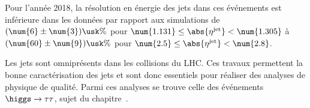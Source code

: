 Pour l'année 2018, la résolution en énergie des jets dans ces événements est inférieure dans les données par rapport aux simulations
de
$(\num{6}\pm\num{3})\usk\%$ pour $\num{1.131} \leq \abs{\eta^\text{jet}} < \num{1.305}$
à
$(\num{60}\pm\num{9})\usk\%$ pour $\num{2.5} \leq \abs{\eta^\text{jet}} < \num{2.8}$.
\par Les jets sont omniprésents dans les collisions du LHC.
Ces travaux permettent la bonne caractérisation des jets et sont donc essentiels pour réaliser des analyses de physique de qualité.
Parmi ces analyses se trouve celle des événements $\higgs\to\tau\tau$, sujet du chapitre~.
